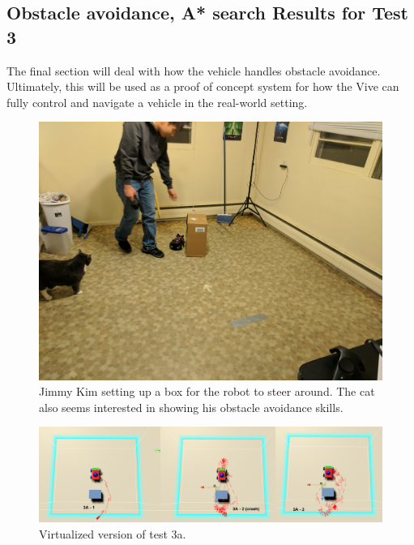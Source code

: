 \documentclass[10pt,a4paper]{article}
\begin{document}
	\subsection*{Obstacle avoidance, A* search Results for Test 3}
	The final section will deal with how the vehicle handles obstacle avoidance. Ultimately, this will be used as a proof of concept system for how the Vive can fully control and navigate a vehicle in the real-world setting.
	
	\begin{figure}
		\centering
		\includegraphics[width=.6\textwidth]{box_setup.jpg}
		\caption{Jimmy Kim setting up a box for the robot to steer around. The cat also seems interested in showing his obstacle avoidance skills.}
		\label{fig:photo_jimmy_box}
	\end{figure}
	
	\begin{figure}
		\centering
		\includegraphics[width=1\textwidth]{Test3_Visuals/Test3a_mosaic.png}
		\caption{Virtualized version of test 3a.}
		\label{fig:vis_comp_t3a}
	\end{figure}
\end{document}
